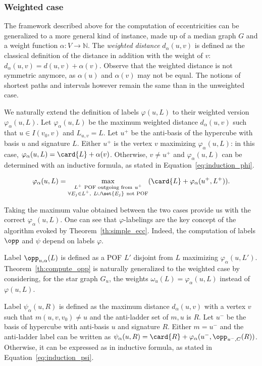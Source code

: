 \subsubsection{Weighted case} \label{subsubsec:weighted}

The framework described above for the computation of eccentricities can be generalized to a more general kind of instance, made up of a median graph $G$ and a weight function $\alpha : V \rightarrow \mathbb{N}$. The \textit{weighted distance} $d_{\alpha}(u,v)$ is defined as the classical definition of the distance in addition with the weight of $v$: $d_{\alpha}(u,v) = d(u,v) + \alpha(v)$. Observe that the weighted distance is not symmetric anymore, as $\alpha(u)$ and $\alpha(v)$ may not be equal. The notions of shortest paths and intervals however remain the same than in the unweighted case.

We naturally extend the definition of labels $\varphi(u,L)$ to their weighted version $\varphi_{\alpha}(u,L)$. Let $\varphi_{\alpha}(u,L)$ be the maximum weighted distance $d_{\alpha}(u,v)$ such that $u \in I(v_0,v)$ and $L_{u,v} = L$. Let $u^+$ be the anti-basis of the hypercube with basis $u$ and signature $L$. Either $u^+$ is the vertex $v$ maximizing $\varphi_{\alpha}(u,L)$: in this case, $\varphi_{\alpha}(u,L) = \card{L} + \alpha(v)$. Otherwise, $v \neq u^+$ and $\varphi_{\alpha}(u,L)$ can be determined with an inductive formula, as stated in Equation~\eqref{eq:induction_phi}.

\[
    \varphi_{\alpha}(u,L) = \max\limits_{\substack{L^+ ~\mbox{\scriptsize{POF outgoing from}}~ u^+ \\ \forall E_j \in L^+,~ L \cup \set{E_j} ~\mbox{\scriptsize{not POF}}}} (\card{L} + \varphi_{\alpha}(u^+,L^+)).
\]

Taking the maximum value obtained between the two cases provide us with the correct $\varphi_{\alpha}(u,L)$. One can see that $\varphi$-labelings are the key concept of the algorithm evoked by Theorem~\ref{th:simple_ecc}. Indeed, the computation of labels $\opp$ and $\psi$ depend on labels $\varphi$. 

Label $\opp_{u,\alpha}(L)$ is defined as a POF $L'$ disjoint from $L$ maximizing $\varphi_{\alpha}(u,L')$. Theorem~\ref{th:compute_opp} is naturally generalized to the weighted case by considering, for the star graph $G_u$, the weights $\omega_u(L) = \varphi_{\alpha}(u,L)$ instead of $\varphi(u,L)$.

Label $\psi_{\alpha}(u,R)$ is defined as the maximum distance $d_{\alpha}(u,v)$ with a vertex $v$ such that $m(u,v,v_0) \neq u$ and the anti-ladder set of $m,u$ is $R$. Let $u^-$ be the basis of hypercube with anti-basis $u$ and signature $R$. Either $m = u^-$ and the anti-ladder label can be written as $\psi_{\alpha}(u,R) = \card{R} + \varphi_{\alpha}(u^-,\opp_{u^-,C}(R))$. Otherwise, it can be expressed as in inductive formula, as stated in Equation~\eqref{eq:induction_psi}.

